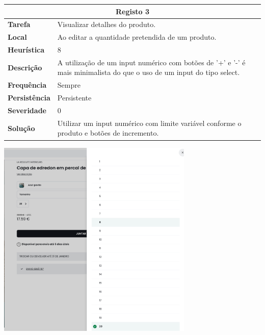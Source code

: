 \documentclass[a4paper,12pt]{article}
\begin{document}
\begin{center}
    \begin{table}[h!]
        \centering
        \begin{tabular}{|m{3cm}|m{12cm}|}
            \hline
            \multicolumn{2}{|c|}{\textbf{Registo 3}}                                                                                                      \\ \hline
            \textbf{Tarefa}       & Visualizar detalhes do produto.                                                                                       \\ \hline
            \textbf{Local}        & Ao editar a quantidade pretendida de um produto.                                                                      \\ \hline
            \textbf{Heurística}   & 8                                                                                                                     \\ \hline
            \textbf{Descrição}    & A utilização de um input numérico com botões de '+' e '-' é mais minimalista do que o uso de um input do tipo select. \\ \hline
            \textbf{Frequência}   & Sempre                                                                                                                \\ \hline
            \textbf{Persistência} & Persistente                                                                                                           \\ \hline
            \textbf{Severidade}   & 0                                                                                                                     \\ \hline
            \textbf{Solução}      & Utilizar um input numérico com limite variável conforme o produto e botões de incremento.                             \\ \hline
        \end{tabular}
    \end{table}
    \vspace{0.5cm}
    \includegraphics[width=0.7\textwidth]{heuristics/02input_quantidade.png}


\end{center}
\end{document}
